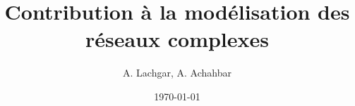 \documentclass[12pt,french]{book}
\title{Contribution à la modélisation des réseaux complexes}
\author{A. Lachgar, A. Achahbar}
\date{\today}
\begin{document}
	\sffamily
\frontmatter  
\maketitle



\tableofcontents
\listoffigures
\mainmatter






 
%
%
 

 \appendix
% 
\end{document}
